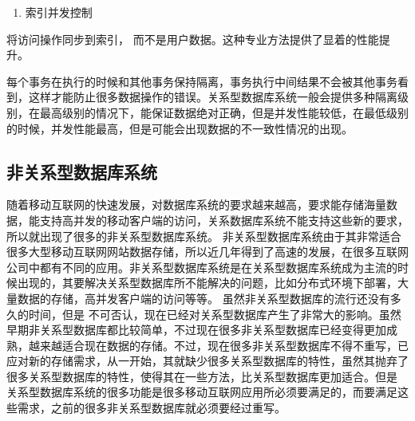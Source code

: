 	\begin{enumerate}[resume]
		\item 索引并发控制
	\end{enumerate}

将访问操作同步到索引，
而不是用户数据。这种专业方法提供了显着的性能提升。

每个事务在执行的时候和其他事务保持隔离，事务执行中间结果不会被其他事务看到，这样才能防止很多数据操作的错误。关系型数据库系统一般会提供多种隔离级别，在最高级别的情况下，能保证数据绝对正确，但是并发性能较低，在最低级别的时候，并发性能最高，但是可能会出现数据的不一致性情况的出现。
\subsection{非关系型数据库系统}
随着移动互联网的快速发展，对数据库系统的要求越来越高，要求能存储海量数据，能支持高并发的移动客户端的访问，关系数据库系统不能支持这些新的要求，所以就出现了很多的非关系型数据库系统。
非关系型数据库系统由于其非常适合很多大型移动互联网网站数据存储，所以近几年得到了高速的发展，在很多互联网公司中都有不同的应用。非关系型数据库系统是在关系型数据库系统成为主流的时候出现的，其要解决关系型数据库所不能解决的问题，比如分布式环境下部署，大量数据的存储，高并发客户端的访问等等。
虽然非关系型数据库的流行还没有多久的时间，但是
不可否认，现在已经对关系型数据库产生了非常大的影响。虽然早期非关系型数据库都比较简单，不过现在很多非关系型数据库已经变得更加成熟，越来越适合现在数据的存储。不过，现在很多非关系型数据库不得不重写，已应对新的存储需求，从一开始，其就缺少很多关系型数据库的特性，虽然其抛弃了很多关系型数据库的特性，使得其在一些方法，比关系型数据库更加适合。但是
关系型数据库系统的很多功能是很多移动互联网应用所必须要满足的，而要满足这些需求，之前的很多非关系型数据库就必须要经过重写。


